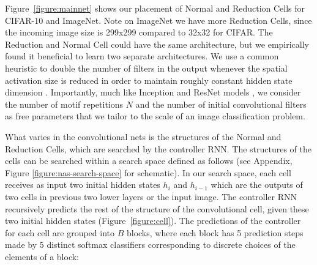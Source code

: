 \documentclass[10pt,twocolumn,letterpaper]{article}
\begin{document}
Figure~\ref{figure:mainnet} shows our placement of Normal and Reduction Cells for CIFAR-10 and ImageNet. Note on ImageNet we have more Reduction Cells, since the incoming image size is 299x299 compared to 32x32 for CIFAR. The Reduction and Normal Cell could have the same architecture, but we empirically found it beneficial to learn two separate architectures.
We use a common heuristic to double the number of filters in the output whenever the spatial activation size is reduced in order to maintain roughly constant hidden state dimension \cite{krizhevsky2012imagenet,simonyan2014very}.
Importantly,
much like Inception and ResNet models \cite{szegedy2015going,he2015deep,szegedy2016rethinking,szegedy2016inception},
we consider the number of motif repetitions $N$ and the number of initial convolutional filters as free parameters that we tailor to the scale of an image classification problem.

What varies in the convolutional nets is the structures of the Normal and Reduction Cells, which are searched by the controller RNN. 
The structures of the cells can be searched within a search space defined as follows (see Appendix, Figure \ref{figure:nas-search-space} for schematic). In our search space, each cell receives as input two initial hidden states $h_i$ and $h_{i-1}$ which are the outputs of two cells in previous two lower layers or the input image. The controller RNN recursively predicts the rest of the structure of the convolutional cell, given these two initial hidden states (Figure~\ref{figure:cell}). The predictions of the controller for each cell are grouped into $B$ blocks, where each block has 5 prediction steps made by 5 distinct softmax classifiers corresponding to discrete choices of the elements of a block:
\end{document}
